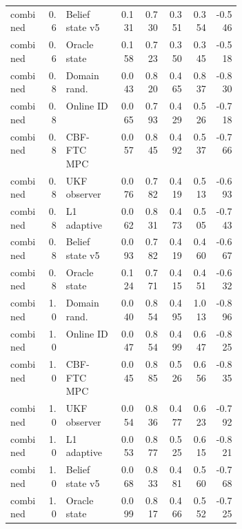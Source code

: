 \documentclass{article}
\begin{document}
\begin{center}
\begin{longtable}{p{0.16\linewidth}rp{0.23\linewidth}rrrrr}
combined & 0.6 & Belief state v5 & 0.131 & 0.730 & 0.351 & 0.354 & -0.546\\
combined & 0.6 & Oracle state & 0.158 & 0.723 & 0.350 & 0.345 & -0.518\\
combined & 0.8 & Domain rand. & 0.043 & 0.820 & 0.465 & 0.837 & -0.830\\
combined & 0.8 & Online ID & 0.065 & 0.793 & 0.429 & 0.526 & -0.718\\
combined & 0.8 & CBF-FTC MPC & 0.057 & 0.845 & 0.492 & 0.537 & -0.766\\
combined & 0.8 & UKF observer & 0.076 & 0.782 & 0.419 & 0.513 & -0.693\\
combined & 0.8 & L1 adaptive & 0.062 & 0.831 & 0.473 & 0.505 & -0.743\\
combined & 0.8 & Belief state v5 & 0.093 & 0.782 & 0.419 & 0.460 & -0.667\\
combined & 0.8 & Oracle state & 0.124 & 0.771 & 0.415 & 0.451 & -0.632\\
combined & 1.0 & Domain rand. & 0.040 & 0.854 & 0.495 & 1.013 & -0.896\\
combined & 1.0 & Online ID & 0.047 & 0.854 & 0.499 & 0.647 & -0.825\\
combined & 1.0 & CBF-FTC MPC & 0.045 & 0.885 & 0.526 & 0.656 & -0.835\\
combined & 1.0 & UKF observer & 0.054 & 0.836 & 0.477 & 0.623 & -0.792\\
combined & 1.0 & L1 adaptive & 0.053 & 0.877 & 0.525 & 0.615 & -0.821\\
combined & 1.0 & Belief state v5 & 0.068 & 0.833 & 0.481 & 0.560 & -0.768\\
combined & 1.0 & Oracle state & 0.099 & 0.817 & 0.466 & 0.552 & -0.725\\
\bottomrule
\end{longtable}
\normalsize
\end{center}
\end{document}
